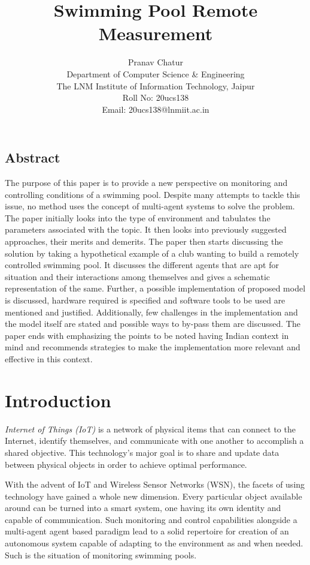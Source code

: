 \documentclass[12pt]{article}
\title{Swimming Pool Remote Measurement}
\author{Pranav Chatur\\Department of Computer Science \& Engineering\\The LNM Institute of Information Technology, Jaipur\\Roll No: 20ucs138\\Email: 20ucs138@lnmiit.ac.in}
\date{}
\begin{document}
\maketitle

\begin{center}
    \section*{Abstract}
    The purpose of this paper is to provide a new perspective on monitoring and controlling conditions of a swimming pool. Despite many attempts to tackle this issue, no method uses the concept of multi-agent systems to solve the problem. The paper initially looks into the type of environment and tabulates the parameters associated with the topic. It then looks into previously suggested approaches, their merits and demerits. The paper then starts discussing the solution by taking a hypothetical example of a club wanting to build a remotely controlled swimming pool. It discusses the different agents that are apt for situation and their interactions among themselves and gives a schematic representation of the same. Further, a possible implementation of proposed model is discussed, hardware required is specified and software tools to be used are mentioned and justified. Additionally, few challenges in the implementation and the model itself are stated and possible ways to by-pass them are discussed. The paper ends with emphasizing the points to be noted having Indian context in mind and recommends strategies to make the implementation more relevant and effective in this context.
\end{center}


\section{Introduction}
\textit{Internet of Things (IoT)} is a network of physical items that can connect to the Internet, identify themselves, and communicate with one another to accomplish a shared objective. This technology’s major goal is to share and update data between physical objects in order to achieve optimal performance. \cite{iotDef}

With the advent of IoT and Wireless Sensor Networks (WSN), the facets of using technology have gained a whole new dimension. 
Every particular object available around can be turned into a smart system, one having its own identity and capable of communication. 
Such monitoring and control capabilities alongside a multi-agent agent based paradigm lead to a solid repertoire for creation of an autonomous system capable of adapting to the environment as and when needed. 
Such is the situation of monitoring swimming pools.
\\
\end{document}

